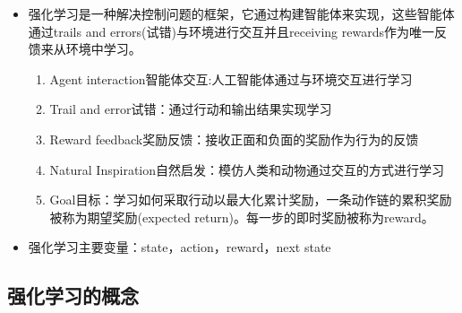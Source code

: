 \documentclass[UTF8]{ctexart}
\begin{document}
\begin{itemize}
    \item 强化学习是一种解决控制问题的框架，它通过构建智能体来实现，这些智能体通过trails and errors(试错)与环境进行交互并且receiving rewards作为唯一反馈来从环境中学习。
    \begin{enumerate}
        \item Agent interaction智能体交互:人工智能体通过与环境交互进行学习
        \item Trail and error试错：通过行动和输出结果实现学习
        \item Reward feedback奖励反馈：接收正面和负面的奖励作为行为的反馈
        \item Natural Inspiration自然启发：模仿人类和动物通过交互的方式进行学习
        \item Goal目标：学习如何采取行动以最大化累计奖励，一条动作链的累积奖励被称为期望奖励(expected return)。每一步的即时奖励被称为reward。
    \end{enumerate}
    \item 强化学习主要变量：state，action，reward，next state
\end{itemize}

\subsection{强化学习的概念}
\end{document}
